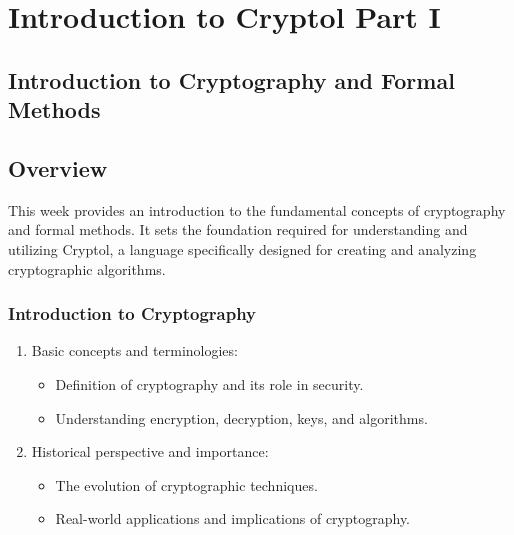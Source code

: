 \chapter{Introduction to Cryptol Part I}


%
%
%
%
\section{Introduction to Cryptography and Formal Methods}
%
\section*{Overview}
This week provides an introduction to the fundamental concepts of cryptography and formal methods. It sets the foundation required for understanding and utilizing Cryptol, a language specifically designed for creating and analyzing cryptographic algorithms.

\subsection{Introduction to Cryptography}
\begin{enumerate}
	\item Basic concepts and terminologies:
	\begin{itemize}
		\item Definition of cryptography and its role in security.
		\item Understanding encryption, decryption, keys, and algorithms.
	\end{itemize}
	\item Historical perspective and importance:
	\begin{itemize}
		\item The evolution of cryptographic techniques.
		\item Real-world applications and implications of cryptography.
	\end{itemize}
\end{enumerate}

